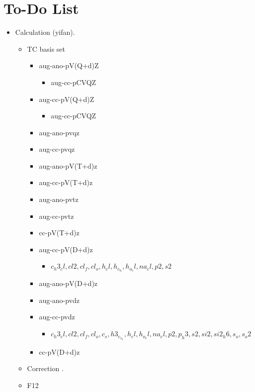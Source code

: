 \section*{To-Do List}
\newcommand{\done}{\item[$\checkmark$]}
\newcommand{\todo}{\item[$\square$]}

\begin{itemize}
    \item Calculation (yifan).
    \begin{itemize}
    \item TC basis set
    \begin{itemize}
        \done aug-ano-pV(Q+d)Z
        \begin{itemize}
            \todo aug-cc-pCVQZ
        \end{itemize}
        \done aug-cc-pV(Q+d)Z
        \begin{itemize}
            \done aug-cc-pCVQZ
        \end{itemize}
        \done aug-ano-pvqz
        \done aug-cc-pvqz
        \done aug-ano-pV(T+d)z
        \done aug-cc-pV(T+d)z
        \done aug-ano-pvtz  
        \done aug-cc-pvtz
        \done cc-pV(T+d)z
        \done aug-cc-pV(D+d)z
         \begin{itemize}
             \item $c_h3_cl,cl2,cl_f,cl_o,h_cl,h_c_n,h_o_cl,na_cl,p2,s2$
         \end{itemize}
        \todo aug-ano-pV(D+d)z
        \done aug-ano-pvdz
        \todo aug-cc-pvdz
         \begin{itemize}
             \item $c_h3_cl,cl2,cl_f,cl_o,c_s,h3_c_s_h,h_cl,h_o_cl,na_cl,p2,p_h3,s2,si2,si2_h6,s_o,s_o2$
         \end{itemize}
        \done cc-pV(D+d)z
    \end{itemize}
    \item Correction .
    \item F12
    \end{itemize}




\end{itemize}
